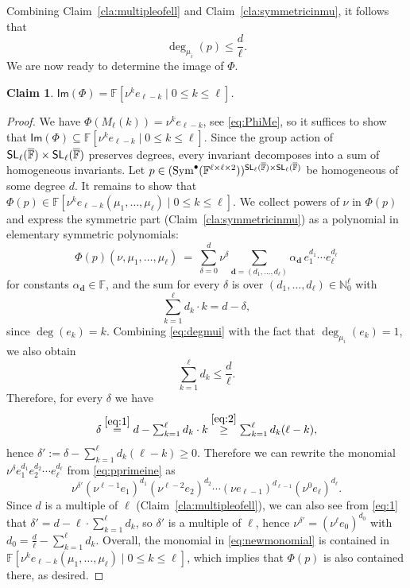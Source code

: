 \documentclass[a4paper]{extarticle}
\newcommand{\IN}{\mathbb{N}}
\newcommand{\IF}{\mathbb{F}}
\newcommand{\oIF}{{\overline{\mathbb{F}}}}
\newcommand{\SL}{\textsf{\textup{SL}}}
\newcommand{\Sym}{\textup{Sym}}
\renewcommand{\Im}{\mathsf{Im}}
\numberwithin{theorem}{section}
\newtheorem{claim}[theorem]{Claim}
\theoremstyle{definition}
\begin{document}
Combining Claim~\ref{cla:multipleofell} and Claim~\ref{cla:symmetricinmu}, it follows that
\begin{equation}\label{eq:degmui}
\textstyle\deg_{\mu_i}(p)\leq\frac{d}{\ell}.
\end{equation}
We are now ready to determine the image of $\Phi$.
\begin{claim}
\label{cla:imageelemsym}
$\Im(\Phi) = \IF\left[\nu^k e_{\ell-k}\mid 0\leq k \leq \ell\right]$.
\end{claim}
\begin{proof}
We have
$\Phi(M_\ell(k)) = \nu^k e_{\ell-k}$, see \eqref{eq:PhiMe}, so it suffices to show that
$\Im(\Phi) \subseteq \IF\left[\nu^k e_{\ell-k}\mid 0\leq k \leq \ell\right]$.
Since the group action of $\SL_\ell(\oIF)\times \SL_\ell(\oIF)$ preserves degrees, every invariant decomposes into a sum of homogeneous invariants.
Let $p \in (\Sym^{\bullet}(\IF^{\ell\times\ell\times 2}))^{\SL_\ell(\oIF)\times \SL_\ell(\oIF)}$
be homogeneous of some degree $d$.
It remains to show that $\Phi(p) \in \IF\left[\nu^k e_{\ell-k}(\mu_1,\dots,\mu_\ell)\mid 0\leq k \leq \ell\right]$.
We collect powers of $\nu$ in $\Phi(p)$ and express the symmetric part (Claim~\ref{cla:symmetricinmu}) as a polynomial in elementary symmetric polynomials:
\begin{equation}
\label{eq:pprimeine}
\Phi(p)(\nu,\mu_1,\dots,\mu_\ell)
 \ = \ 
\sum_{\delta=0}^{d} \nu^\delta \sum_{\mathbf{d}=(d_1,\ldots,d_\ell)} \alpha_{\mathbf{d}} \, e_1^{d_1} \cdots e_\ell^{d_\ell}
\end{equation}
for constants $\alpha_{\mathbf{d}}\in \IF$,
and the sum for every $\delta$ is over
$(d_1,\ldots,d_\ell) \in \IN_0^\ell$ with
\begin{equation}
\label{eq:1}
\textstyle
\sum_{k=1}^\ell d_k \cdot k = d-\delta,
\end{equation}
since $\deg (e_k)=k$.
Combining \eqref{eq:degmui} with the fact that $\deg_{\mu_i}(e_k) = 1$, we also obtain
\begin{equation}
\label{eq:2}
\textstyle
\sum_{k=1}^\ell d_k \leq \frac{d}{\ell}.
\end{equation}
Therefore, for every $\delta$ we have
\[\textstyle
\delta
\stackrel{\eqref{eq:1}}{=}
d - \sum_{k=1}^\ell d_k \cdot k
\stackrel{\eqref{eq:2}}{\geq}
\sum_{k=1}^\ell d_k (\ell-k),
\]
hence $\delta' := \delta-\sum_{k=1}^\ell d_k (\ell-k) \geq 0$.
Therefore we can rewrite the monomial $\nu^\delta e_1^{d_1}e_2^{d_2}\cdots e_\ell^{d_\ell}$
from \eqref{eq:pprimeine}
as
\begin{equation}
\label{eq:newmonomial}
\nu^{\delta'} (\nu^{\ell-1}e_1)^{d_1}(\nu^{\ell-2}e_2)^{d_2}\cdots (\nu e_{\ell-1})^{d_{\ell-1}} (\nu^0 e_\ell)^{d_\ell}.
\end{equation}
Since $d$ is a multiple of $\ell$ (Claim~\ref{cla:multipleofell}),
we can also see from \eqref{eq:1} that $\delta'= d - \ell\cdot \sum_{k=1}^\ell d_k$, so $\delta'$ is a multiple of $\ell$,
hence $\nu^{\delta'} = (\nu^\ell e_0)^{d_0}$ with $d_0 = \frac{d}{\ell}-\sum_{k=1}^\ell d_k$.
Overall, the monomial in \eqref{eq:newmonomial} is contained in $\IF\left[\nu^k e_{\ell-k}(\mu_1,\dots,\mu_\ell)\mid 0\leq k \leq \ell\right]$, which implies that $\Phi(p)$ is also contained there, as desired.
\end{proof}
\end{document}
